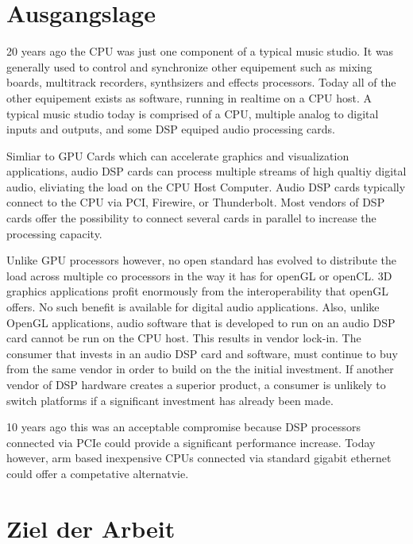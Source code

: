 \section{Ausgangslage}

20 years ago the CPU was just one component of a typical music studio. It was generally used to control and synchronize other equipement such as mixing boards, multitrack recorders, synthsizers and effects processors. Today all of the other equipement exists as software, running in realtime on a CPU host. A typical music studio today is comprised of a CPU, multiple analog to digital inputs and outputs, and some DSP equiped audio processing cards.

Simliar to GPU Cards which can accelerate graphics and visualization applications, audio DSP cards can process multiple streams of high qualtiy digital audio, eliviating the load on the CPU Host Computer. Audio DSP cards typically connect to the CPU via PCI, Firewire, or Thunderbolt. Most vendors of DSP cards offer the possibility to connect several cards in parallel to increase the processing capacity.

Unlike GPU processors however, no open standard has evolved to distribute the load across multiple co processors in the way it has for openGL or openCL. 3D graphics applications profit enormously from the interoperability that openGL offers. No such benefit is available for digital audio applications. Also, unlike OpenGL applications, audio software that is developed to run on an audio DSP card cannot be run on the CPU host. This results in vendor lock-in. The consumer that invests in an audio DSP card and software, must continue to buy from the same vendor in order to build on the the initial investment. If another vendor of DSP hardware creates a superior product, a consumer is unlikely to switch platforms if a significant investment has already been made.

10 years ago this was an acceptable compromise because DSP processors connected via PCIe could provide a significant performance increase. Today however, arm based inexpensive CPUs connected via standard gigabit ethernet could offer a competative alternatvie.

\section{Ziel der Arbeit}

